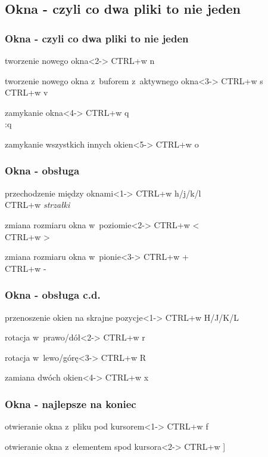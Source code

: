\documentclass{beamer}
\begin{document}
\subsection{Okna - czyli co dwa pliki to nie jeden}
\begin{frame}
	\frametitle{Okna - czyli co dwa pliki to nie jeden}
	\begin{block}{tworzenie nowego okna}<2->
		CTRL+w n
	\end{block}
	\begin{block}{tworzenie nowego okna z~buforem z~aktywnego okna}<3->
		CTRL+w s\\
		CTRL+w v
	\end{block}
	\begin{block}{zamykanie okna}<4->
		CTRL+w q\\
		:q
	\end{block}
	\begin{block}{zamykanie wszystkich innych okien}<5->
		CTRL+w o
	\end{block}
\end{frame}
\begin{frame}
	\frametitle{Okna - obsługa}
	\begin{block}{przechodzenie między oknami}<1->
		CTRL+w h/j/k/l\\
		CTRL+w \textit{strzałki}
	\end{block}
	\begin{block}{zmiana rozmiaru okna w~poziomie}<2->
		CTRL+w \textless\\
		CTRL+w \textgreater
	\end{block}
	\begin{block}{zmiana rozmiaru okna w~pionie}<3->
		CTRL+w +\\
		CTRL+w -
	\end{block}
\end{frame}
\begin{frame}
	\frametitle{Okna - obsługa c.d.}
	\begin{block}{przenoszenie okien na skrajne pozycje}<1->
		CTRL+w H/J/K/L
	\end{block}
	\begin{block}{rotacja w~prawo/dół}<2->
		CTRL+w r
	\end{block}
	\begin{block}{rotacja w~lewo/górę}<3->
		CTRL+w R
	\end{block}
	\begin{block}{zamiana dwóch okien}<4->
		CTRL+w x
	\end{block}
\end{frame}
\begin{frame}
	\frametitle{Okna - najlepsze na koniec}
	\begin{block}{otwieranie okna z~pliku pod kursorem}<1->
	CTRL+w f
	\end{block}
	\begin{block}{otwieranie okna z~elementem spod kursora}<2->
	CTRL+w ]
	\end{block}
\end{frame}
\end{document}
